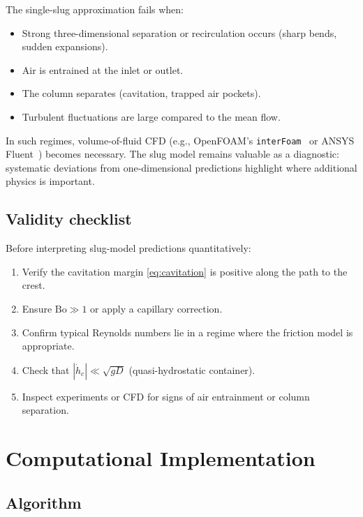 \documentclass[11pt]{article}
\theoremstyle{definition}
\begin{document}
The single-slug approximation fails when:
\begin{itemize}[nosep]
  \item Strong three-dimensional separation or recirculation occurs (sharp bends, sudden 
        expansions).
  \item Air is entrained at the inlet or outlet.
  \item The column separates (cavitation, trapped air pockets).
  \item Turbulent fluctuations are large compared to the mean flow.
\end{itemize}
In such regimes, volume-of-fluid CFD (e.g., OpenFOAM's \texttt{interFoam}~\cite{openfoam} 
or ANSYS Fluent~\cite{ansys_fluent}) becomes necessary. The slug model remains valuable 
as a diagnostic: systematic deviations from one-dimensional predictions highlight where 
additional physics is important.

\subsection{Validity checklist}

Before interpreting slug-model predictions quantitatively:
\begin{enumerate}[nosep]
  \item Verify the cavitation margin \eqref{eq:cavitation} is positive along the path to 
        the crest.
  \item Ensure $\text{Bo} \gg 1$ or apply a capillary correction.
  \item Confirm typical Reynolds numbers lie in a regime where the friction model is 
        appropriate.
  \item Check that $|\dot{h}_c| \ll \sqrt{gD}$ (quasi-hydrostatic container).
  \item Inspect experiments or CFD for signs of air entrainment or column separation.
\end{enumerate}

\section{Computational Implementation}
\label{sec:computation}

\subsection{Algorithm}
\end{document}
